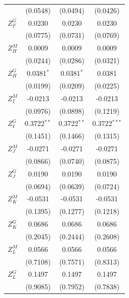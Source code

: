 \begin{tabular}{lccc}
                   & (0.0548)        & (0.0494)           & (0.0426)\\   
   $Z^{G}_F$       & 0.0230          & 0.0230             & 0.0230\\   
                   & (0.0775)        & (0.0731)           & (0.0769)\\   
   $Z^{M}_H$       & 0.0009          & 0.0009             & 0.0009\\   
                   & (0.0244)        & (0.0286)           & (0.0321)\\   
   $Z^{G}_H$       & 0.0381$^{*}$    & 0.0381$^{*}$       & 0.0381\\   
                   & (0.0199)        & (0.0209)           & (0.0225)\\   
   $Z^{M}_I$       & -0.0213         & -0.0213            & -0.0213\\   
                   & (0.0976)        & (0.0898)           & (0.1219)\\   
   $Z^{G}_I$       & 0.3722$^{**}$   & 0.3722$^{**}$      & 0.3722$^{***}$\\   
                   & (0.1451)        & (0.1466)           & (0.1315)\\   
   $Z^{M}_J$       & -0.0271         & -0.0271            & -0.0271\\   
                   & (0.0866)        & (0.0740)           & (0.0875)\\   
   $Z^{G}_J$       & 0.0190          & 0.0190             & 0.0190\\   
                   & (0.0694)        & (0.0639)           & (0.0724)\\   
   $Z^{M}_K$       & -0.0531         & -0.0531            & -0.0531\\   
                   & (0.1395)        & (0.1277)           & (0.1218)\\   
   $Z^{G}_K$       & 0.0686          & 0.0686             & 0.0686\\   
                   & (0.2045)        & (0.2444)           & (0.2608)\\   
   $Z^{M}_L$       & 0.0566          & 0.0566             & 0.0566\\   
                   & (0.7108)        & (0.7571)           & (0.8313)\\   
   $Z^{G}_L$       & 0.1497          & 0.1497             & 0.1497\\   
                   & (0.9085)        & (0.7952)           & (0.7838)\\   

\end{tabular}
